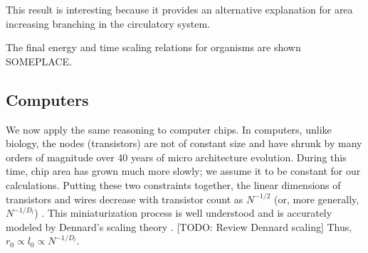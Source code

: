 \documentclass[12pt]{article}
\begin{document}
This result is interesting because it provides an alternative
explanation for area increasing branching in the circulatory system.

The final energy and time scaling relations for 
organisms are shown SOMEPLACE.


\subsection{Computers}
\label{sec:computers}

We now apply the same reasoning to computer chips. 
In computers, unlike biology, the nodes (transistors) 
are not of constant size and have shrunk by many orders of magnitude over
40 years of micro architecture evolution.  During this time,
chip area has grown much more slowly; we assume it to be constant for our calculations.
Putting these two constraints together, the linear 
dimensions of transistors and wires decrease with transistor count as 
$N^{-1/2}$ (or, more generally, $N^{-1/D_l}$) \cite{moses08}.  This 
miniaturization process is well understood and is accurately modeled 
by Dennard's scaling theory \cite{dennard74}.  [TODO: Review Dennard scaling]  
Thus, $r_0 \propto l_0 \propto N^{-1/D_l}$.
\end{document}
